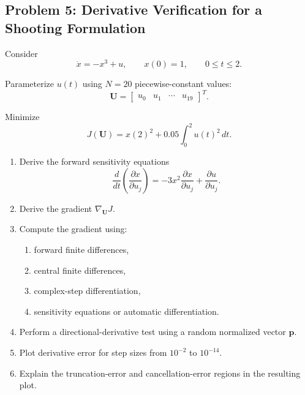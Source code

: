 \subsection*{Problem 5: Derivative Verification for a Shooting Formulation}

Consider
\begin{equation}
\dot{x}=-x^3+u,
\qquad
x(0)=1,
\qquad
0\leq t\leq 2.
\end{equation}

Parameterize $u(t)$ using $N=20$ piecewise-constant values:
\begin{equation}
\mathbf{U}
=
\begin{bmatrix}
u_0 & u_1 & \cdots & u_{19}
\end{bmatrix}^{T}.
\end{equation}

Minimize
\begin{equation}
J(\mathbf{U})
=
x(2)^2
+
0.05
\int_0^2u(t)^2\,dt.
\end{equation}

\begin{enumerate}
    \item Derive the forward sensitivity equations
    \begin{equation}
    \frac{d}{dt}
    \left(
    \frac{\partial x}{\partial u_j}
    \right)
    =
    -3x^2
    \frac{\partial x}{\partial u_j}
    +
    \frac{\partial u}{\partial u_j}.
    \end{equation}
    
    \item Derive the gradient $\nabla_{\mathbf{U}}J$.
    
    \item Compute the gradient using:
    \begin{enumerate}
        \item forward finite differences,
        \item central finite differences,
        \item complex-step differentiation,
        \item sensitivity equations or automatic differentiation.
    \end{enumerate}
    
    \item Perform a directional-derivative test using a random normalized vector
    $\mathbf{p}$.
    
    \item Plot derivative error for step sizes from $10^{-2}$ to $10^{-14}$.
    
    \item Explain the truncation-error and cancellation-error regions in the
    resulting plot.
\end{enumerate}


